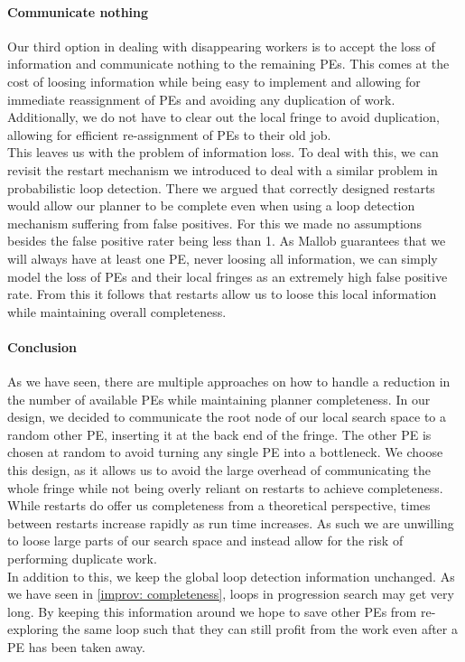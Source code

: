 \paragraph{Communicate nothing}
Our third option in dealing with disappearing workers is to accept the loss of information and communicate nothing to the remaining PEs. This comes at the cost of loosing information while being easy to implement and allowing for immediate reassignment of PEs and avoiding any duplication of work. Additionally, we do not have to clear out the local fringe to avoid duplication, allowing for efficient re-assignment of PEs to their old job. \\
This leaves us with the problem of information loss. To deal with this, we can revisit the restart mechanism we introduced to deal with a similar problem in probabilistic loop detection. There we argued that correctly designed restarts would allow our planner to be complete even when using a loop detection mechanism suffering from false positives. For this we made no assumptions besides the false positive rater being less than 1. As Mallob guarantees that we will always have at least one PE, never loosing all information, we can simply model the loss of PEs and their local fringes as an extremely high false positive rate. From this it follows that restarts allow us to loose this local information while maintaining overall completeness.

\paragraph{Conclusion}
As we have seen, there are multiple approaches on how to handle a reduction in the number of available PEs while maintaining planner completeness. In our design, we decided to communicate the root node of our local search space to a random other PE, inserting it at the back end of the fringe. The other PE is chosen at random to avoid turning any single PE into a bottleneck. We choose this design, as it allows us to avoid the large overhead of communicating the whole fringe while not being overly reliant on restarts to achieve completeness. While restarts do offer us completeness from a theoretical perspective, times between restarts increase rapidly as run time increases. As such we are unwilling to loose large parts of our search space and instead allow for the risk of performing duplicate work. \\
In addition to this, we keep the global loop detection information unchanged. As we have seen in \ref{improv: completeness}, loops in progression search may get very long. By keeping this information around we hope to save other PEs from re-exploring the same loop such that they can still profit from the work even after a PE has been taken away.
\begin{comment}
- keep the search space around
- restarts offer completeness from a theoretical perspective
- however, in practice it may take a long time
- we are not willing to loose potentially very large parts of our search space
\end{comment}
			
